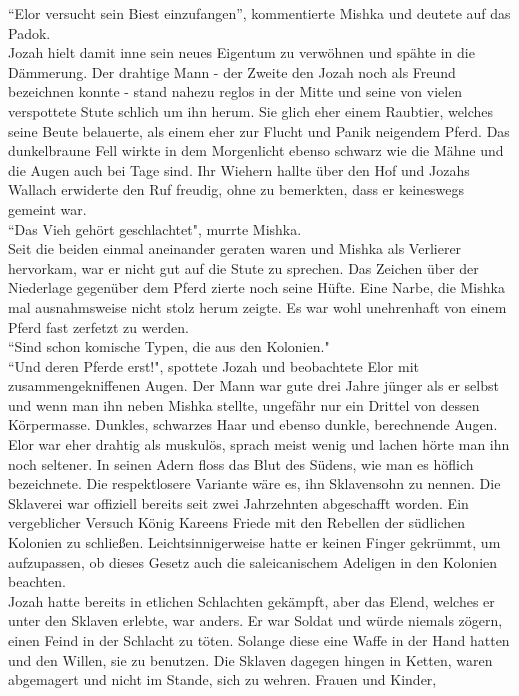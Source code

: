 ``Elor versucht sein Biest einzufangen'', kommentierte Mishka und deutete auf das Padok.\\
Jozah hielt damit inne sein neues Eigentum zu verwöhnen und spähte in die Dämmerung. Der drahtige 
Mann - der Zweite den Jozah noch als Freund bezeichnen konnte - stand nahezu reglos in der Mitte 
und seine von vielen verspottete Stute schlich um ihn herum. Sie glich eher einem Raubtier, welches 
seine Beute belauerte, als einem eher zur Flucht und Panik neigendem Pferd. Das dunkelbraune Fell 
wirkte in dem Morgenlicht ebenso schwarz wie die Mähne und die Augen auch bei Tage sind. Ihr 
Wiehern hallte über den Hof und Jozahs Wallach erwiderte den Ruf freudig, ohne zu bemerkten, dass 
er keineswegs gemeint war. \\
``Das Vieh gehört geschlachtet", murrte Mishka.\\
Seit die beiden einmal aneinander geraten waren und Mishka als Verlierer hervorkam, war er nicht 
gut auf die Stute zu sprechen. Das Zeichen über der Niederlage gegenüber dem Pferd zierte noch 
seine Hüfte. Eine Narbe, die Mishka mal ausnahmsweise nicht stolz herum zeigte. Es war wohl 
unehrenhaft von einem Pferd fast zerfetzt zu werden. \\
``Sind schon komische Typen, die aus den Kolonien."\\ 
``Und deren Pferde erst!", spottete Jozah und beobachtete Elor mit zusammengekniffenen Augen. 
Der Mann war gute drei Jahre jünger als er selbst und wenn man ihn neben Mishka stellte, ungefähr 
nur ein Drittel von dessen Körpermasse. Dunkles, schwarzes Haar und ebenso dunkle, berechnende 
Augen. Elor war eher drahtig als muskulös, sprach meist wenig und lachen hörte man ihn noch 
seltener. In seinen Adern floss das Blut des Südens, wie man es höflich bezeichnete. Die 
respektlosere Variante wäre es, ihn Sklavensohn zu nennen. Die Sklaverei war offiziell bereits seit 
zwei Jahrzehnten abgeschafft worden. Ein vergeblicher Versuch König Kareens Friede mit den Rebellen 
der südlichen Kolonien zu schließen. Leichtsinnigerweise hatte er keinen Finger gekrümmt, um 
aufzupassen, ob dieses Gesetz auch die saleicanischem Adeligen in den Kolonien beachten.\\
Jozah hatte bereits in etlichen Schlachten gekämpft, aber das Elend, welches er unter den Sklaven 
erlebte, war anders. Er war Soldat und würde niemals zögern, einen Feind in der Schlacht zu töten. 
Solange diese eine Waffe in der Hand hatten und den Willen, sie zu benutzen. Die Sklaven dagegen 
hingen in Ketten, waren abgemagert und nicht im Stande, sich zu wehren. Frauen und Kinder, 
